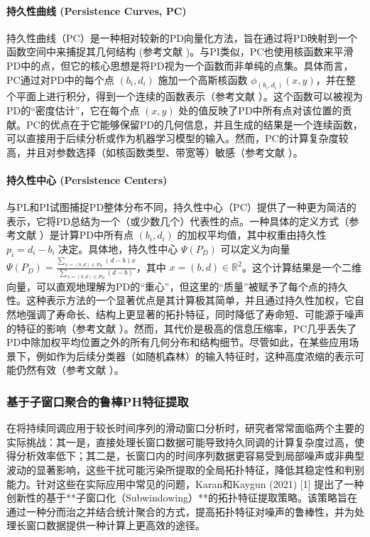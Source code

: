             \paragraph{持久性曲线 (Persistence Curves, PC)}
                \label{sec:feat_pc}
                持久性曲线（PC）是一种相对较新的PD向量化方法，旨在通过将PD映射到一个函数空间中来捕捉其几何结构 (参考文献 \cite{source:17, source:595})。与PI类似，PC也使用核函数来平滑PD中的点，但它的核心思想是将PD视为一个函数而非单纯的点集。具体而言，PC通过对PD中的每个点 $(b_i, d_i)$ 施加一个高斯核函数 $\phi_{(b_i, d_i)}(x, y)$，并在整个平面上进行积分，得到一个连续的函数表示（参考文献 \cite{source:66}）。这个函数可以被视为PD的“密度估计”，它在每个点 $(x, y)$ 处的值反映了PD中所有点对该位置的贡献。PC的优点在于它能够保留PD的几何信息，并且生成的结果是一个连续函数，可以直接用于后续分析或作为机器学习模型的输入。然而，PC的计算复杂度较高，并且对参数选择（如核函数类型、带宽等）敏感（参考文献 \cite{}）。
            \paragraph{持久性中心 (Persistence Centers)}
                \label{sec:feat_pcen}
                与PL和PI试图捕捉PD整体分布不同，持久性中心（PC）提供了一种更为简洁的表示，它将PD总结为一个（或少数几个）代表性的点。一种具体的定义方式（参考文献 \cite{source:528, source:531}）是计算PD中所有点 $(b_i, d_i)$ 的加权平均值，其中权重由持久性 $p_i = d_i - b_i$ 决定。具体地，持久性中心 $\Psi(P_D)$ 可以定义为向量 $\Psi(P_D) = \frac{\sum_{x=(b,d) \in P_D} (d-b) x}{\sum_{x=(b,d) \in P_D} (d-b)}$，其中 $x = (b, d) \in \mathbb{R}^2$。这个计算结果是一个二维向量，可以直观地理解为PD的“重心”，但这里的“质量”被赋予了每个点的持久性。这种表示方法的一个显著优点是其计算极其简单，并且通过持久性加权，它自然地强调了寿命长、结构上更显著的拓扑特征，同时降低了寿命短、可能源于噪声的特征的影响（参考文献 \cite{}）。然而，其代价是极高的信息压缩率，PC几乎丢失了PD中除加权平均位置之外的所有几何分布和结构细节。尽管如此，在某些应用场景下，例如作为后续分类器（如随机森林）的输入特征时，这种高度浓缩的表示可能仍然有效（参考文献 \cite{}）。

        \subsubsection{基于子窗口聚合的鲁棒PH特征提取}
        在将持续同调应用于较长时间序列的滑动窗口分析时，研究者常常面临两个主要的实际挑战：其一是，直接处理长窗口数据可能导致持久同调的计算复杂度过高，使得分析效率低下；其二是，长窗口内的时间序列数据更容易受到局部噪声或非典型波动的显著影响，这些干扰可能污染所提取的全局拓扑特征，降低其稳定性和判别能力。针对这些在实际应用中常见的问题，Karan和Kaygun (2021) [1] 提出了一种创新性的基于**子窗口化（Subwindowing）**的拓扑特征提取策略。该策略旨在通过一种分而治之并结合统计聚合的方式，提高拓扑特征对噪声的鲁棒性，并为处理长窗口数据提供一种计算上更高效的途径。

